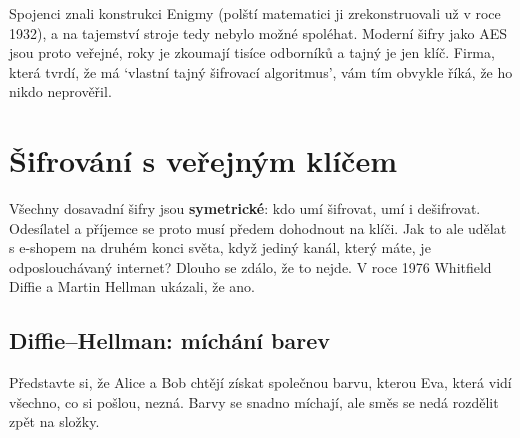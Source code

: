 Spojenci znali konstrukci Enigmy (polští matematici ji zrekonstruovali už v roce 1932), a na tajemství stroje tedy nebylo možné spoléhat. Moderní šifry jako AES jsou proto veřejné, roky je zkoumají tisíce odborníků a tajný je jen klíč. Firma, která tvrdí, že má `vlastní tajný šifrovací algoritmus', vám tím obvykle říká, že ho nikdo neprověřil.

\section{Šifrování s veřejným klíčem}

Všechny dosavadní šifry jsou \textbf{symetrické}: kdo umí šifrovat, umí i dešifrovat. Odesílatel a příjemce se proto musí předem dohodnout na klíči. Jak to ale udělat s e-shopem na druhém konci světa, když jediný kanál, který máte, je odposlouchávaný internet? Dlouho se zdálo, že to nejde. V roce 1976 Whitfield Diffie a Martin Hellman ukázali, že ano.

\subsection{Diffie--Hellman: míchání barev}

Představte si, že Alice a Bob chtějí získat společnou barvu, kterou Eva, která vidí všechno, co si pošlou, nezná. Barvy se snadno míchají, ale směs se nedá rozdělit zpět na složky.

